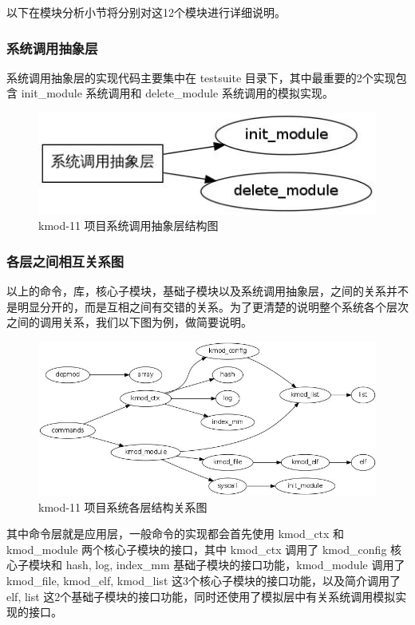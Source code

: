 \documentclass[11pt,a4paper]{article}
\makeatletter
\def\maxwidth{\ifdim\Gin@nat@width>\linewidth\linewidth
\else\Gin@nat@width\fi}
\let\Oldincludegraphics\includegraphics
\renewcommand{\includegraphics}[1]{\Oldincludegraphics[width=\maxwidth]{#1}}
\makeatother
\begin{document}
以下在模块分析小节将分别对这12个模块进行详细说明。

\subsubsection{系统调用抽象层}

系统调用抽象层的实现代码主要集中在 testsuite
目录下，其中最重要的2个实现包含 init\_module 系统调用和 delete\_module
系统调用的模拟实现。

\begin{figure}[htbp]
\centering
\includegraphics{./figures/3-syscall.jpg}
\caption{kmod-11 项目系统调用抽象层结构图}
\end{figure}

\subsubsection{各层之间相互关系图}

以上的命令，库，核心子模块，基础子模块以及系统调用抽象层，之间的关系并不是明显分开的，而是互相之间有交错的关系。为了更清楚的说明整个系统各个层次之间的调用关系，我们以下图为例，做简要说明。

\begin{figure}[htbp]
\centering
\includegraphics{./figures/sys.jpg}
\caption{kmod-11 项目系统各层结构关系图}
\end{figure}

其中命令层就是应用层，一般命令的实现都会首先使用 kmod\_ctx 和
kmod\_module 两个核心子模块的接口，其中 kmod\_ctx 调用了 kmod\_config
核心子模块和 hash, log, index\_mm 基础子模块的接口功能，kmod\_module
调用了 kmod\_file, kmod\_elf, kmod\_list
这3个核心子模块的接口功能，以及简介调用了 elf, list
这2个基础子模块的接口功能，同时还使用了模拟层中有关系统调用模拟实现的接口。
\end{document}

